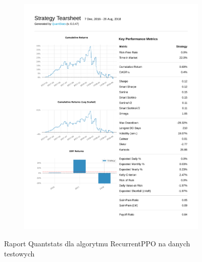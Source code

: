 \documentclass[12pt,a4paper]{article}
\begin{document}
\begin{figure}[ht!]
\begin{subfigure}[ht!]{0.45\textwidth}
    \includegraphics[page=3, width=\textwidth]{plots/qs_rppo.pdf}
  \end{subfigure}
  \caption{Raport Quantstats dla algorytmu RecurrentPPO na
    danych testowych}
\end{figure}
\end{document}

